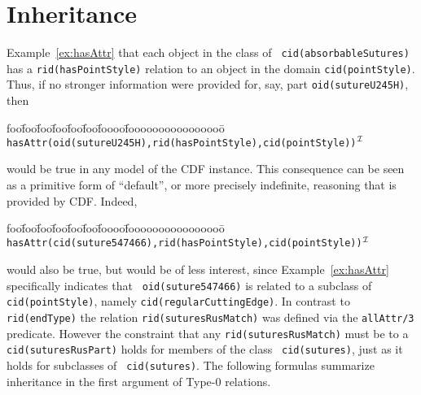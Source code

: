 \section{Inheritance} \label{sec:inheritance}

Example~\ref{ex:hasAttr} that each object in the class of {\tt
cid(absorbableSutures)} has a {\tt rid(hasPointStyle)} relation to an
object in the domain {\tt cid(pointStyle)}.  Thus, if no stronger
information were provided for, say, part {\tt oid(sutureU245H)}, then
{\small 
\begin{tabbing}
foo\=foo\=foo\=foo\=foo\=foo\=foooo\=foooooooooooooooo\=\kill
\> {\tt hasAttr(oid(sutureU245H),rid(hasPointStyle),cid(pointStyle))}$^{{\cal I}}$
\end{tabbing} } 
\noindent would be true in any model of the CDF instance.  This
consequence can be seen as a primitive form of ``default'', or more
precisely indefinite, reasoning that is provided by CDF.  Indeed,
{\small 
\begin{tabbing}
foo\=foo\=foo\=foo\=foo\=foo\=foooo\=foooooooooooooooo\=\kill
\> {\tt
hasAttr(cid(suture547466),rid(hasPointStyle),cid(pointStyle))$^{{\cal I}}$} 
\end{tabbing} } 
\noindent would also be true, but would be of less interest, since
Example~\ref{ex:hasAttr} specifically indicates that {\tt
oid(suture547466)} is related to a subclass of {\tt cid(pointStyle)},
namely {\tt cid(regularCuttingEdge)}.  In contrast to {\tt
rid(endType)} the relation {\tt rid(suturesRusMatch)} was defined via
the {\tt allAttr/3} predicate.  
However the constraint that any {\tt rid(suturesRusMatch)} must be to
a {\tt cid(suturesRusPart)} holds for members of the class {\tt
cid(sutures)}, just as it holds for subclasses of {\tt
cid(sutures)}. 
The following formulas summarize inheritance in the
first argument of Type-0 relations.


